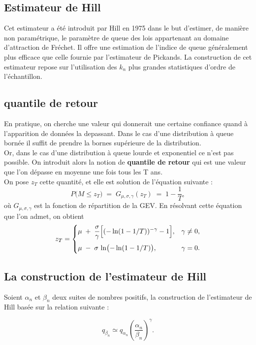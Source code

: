 \documentclass{article}
\theoremstyle{plain}
\theoremstyle{definition}
\theoremstyle{plain}
\begin{document}
\subsection{Estimateur de Hill}
Cet estimateur a été introduit par Hill en 1975 dans le but d’estimer, de manière non paramétrique, le paramètre de queue des lois appartenant au domaine d’attraction de Fréchet. Il offre une estimation de l’indice de queue généralement plus efficace que celle fournie par l’estimateur de Pickands. La construction de cet estimateur repose sur l’utilisation des $k_n$ plus grandes statistiques d’ordre de l’échantillon.


\subsection{quantile de retour}

En pratique, on cherche une valeur qui donnerait une certaine confiance quand à l'apparition
de données la depassant. Dans le cas d'une distribution à queue bornée il suffit de prendre la bornes supérieure de la distribution.
\\
Or, dans le cas d'une distribution à queue lourde et exponentiel ce n'est pas possible. On introduit alors la notion de \textbf{quantile de retour} qui est une valeur que l'on dépasse en moyenne une fois tous les T ans.
\\
On pose $z_T$ cette quantité, et elle est solution de l'équation suivante :
\[
P\bigl(M \le z_T\bigr)
\;=\;
G_{\mu,\sigma,\gamma}(z_T)
\;=\;
1 - \frac{1}{T},
\]
où \(G_{\mu,\sigma,\gamma}\) est la fonction de répartition de la GEV. En résolvant cette équation que l'on admet, on obtient
\[
z_T =
\begin{cases}
\displaystyle
\mu \;+\;\frac{\sigma}{\gamma}\Bigl[(-\ln(1 - 1/T))^{-\gamma} - 1\Bigr],
&\gamma \neq 0,\\[1em]
\displaystyle
\mu \;-\;\sigma\,\ln\bigl(-\ln(1 - 1/T)\bigr),
&\gamma = 0.
\end{cases}
\]
\subsection{La construction de l’estimateur de Hill}

Soient $\alpha_n$ et $\beta_n$ deux suites de nombres positifs, la construction de l’estimateur de Hill basée sur la relation suivante :

\begin{equation}
    q_{\beta_n} \simeq q_{\alpha_n} \left( \frac{\alpha_n}{\beta_n} \right)^{\gamma}.
    \tag{1.6}
\end{equation}
\end{document}
